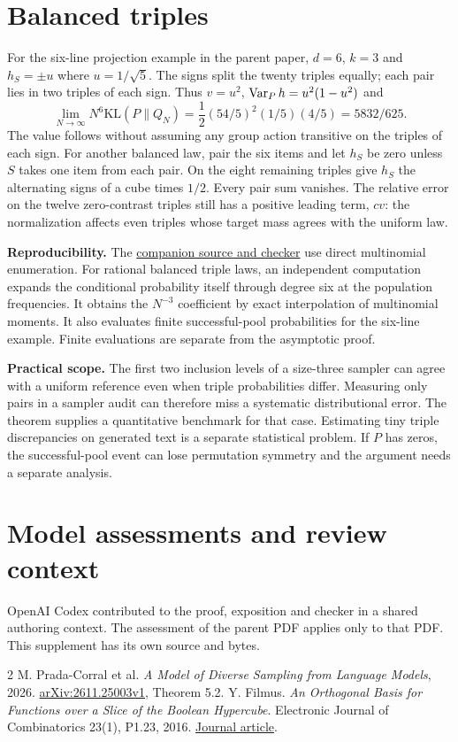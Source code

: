 \documentclass[11pt]{article}
\begin{document}
\newpage
\section{Balanced triples}
For the six-line projection example in the parent paper, $d=6$, $k=3$ and $h_S=\pm u$ where $u=1/\sqrt5$. The signs split the twenty triples equally; each pair lies in two triples of each sign. Thus $v=u^2$, $\operatorname{Var}_P h=u^2(1-u^2)$ and
\[
               \lim_{N\to\infty}N^6\mathrm{KL}(P\|Q_N)
               =\frac12(54/5)^2(1/5)(4/5)=5832/625.
\]
The value follows without assuming any group action transitive on the triples of each sign. For another balanced law, pair the six items and let $h_S$ be zero unless $S$ takes one item from each pair. On the eight remaining triples give $h_S$ the alternating signs of a cube times $1/2$. Every pair sum vanishes. The relative error on the twelve zero-contrast triples still has a positive leading term, $cv$: the normalization affects even triples whose target mass agrees with the uniform law.

\textbf{Reproducibility.} The \href{https://github.com/lluiseriksson/THE-ERIKSSON-PROGRAMME/tree/codex/pool-bias-20261120/audits/pool-dpp}{companion source and checker} use direct multinomial enumeration. For rational balanced triple laws, an independent computation expands the conditional probability itself through degree six at the population frequencies. It obtains the $N^{-3}$ coefficient by exact interpolation of multinomial moments. It also evaluates finite successful-pool probabilities for the six-line example. Finite evaluations are separate from the asymptotic proof.

\textbf{Practical scope.} The first two inclusion levels of a size-three sampler can agree with a uniform reference even when triple probabilities differ. Measuring only pairs in a sampler audit can therefore miss a systematic distributional error. The theorem supplies a quantitative benchmark for that case. Estimating tiny triple discrepancies on generated text is a separate statistical problem. If $P$ has zeros, the successful-pool event can lose permutation symmetry and the argument needs a separate analysis.

\section*{Model assessments and review context}
OpenAI Codex contributed to the proof, exposition and checker in a shared authoring context. The assessment of the parent PDF applies only to that PDF. This supplement has its own source and bytes.
\begin{thebibliography}{2}\small
{} M. Prada-Corral et al. \emph{A Model of Diverse Sampling from Language Models}, 2026. \href{https://arxiv.org/abs/2611.25003v1}{arXiv:2611.25003v1}, Theorem 5.2.
 Y. Filmus. \emph{An Orthogonal Basis for Functions over a Slice of the Boolean Hypercube}. Electronic Journal of Combinatorics 23(1), P1.23, 2016. \href{https://www.combinatorics.org/ojs/index.php/eljc/article/view/v23i1p23}{Journal article}.
\end{thebibliography}
\end{document}
